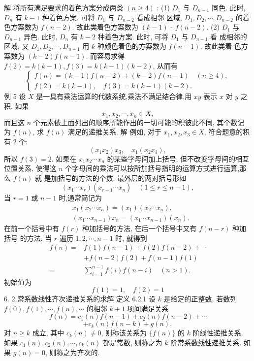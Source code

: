 \documentclass{report}
\begin{document}
	
	解 将所有满足要求的着色方案分成两类 $(n \geqslant 4)$ :
	(1) $D_1$ 与 $D_{n-1}$ 同色. 此时, $D_n$ 有 $k-1$ 种着色方案. 可将 $D_1$ 与 $D_{n-2}$ 看成相邻 区域, $D_1, D_2, \cdots, D_{n-2}$ 的着色方案数为 $f(n-2)$. 故此类着色方案数为 $(k-1)$ - $f(n-2)$.
	(2) $D_1$ 与 $D_{n-1}$ 异色. 此时, $D_n$ 有 $k-2$ 种着色方案. 此时, 可将 $D_1$ 与 $D_{n-1}$ 看 成相邻的区域. 又 $D_1, D_2, \cdots, D_{n-1}$ 用 $k$ 种颜色着色的方案数为 $f(n-1)$, 故此类着 色方案数为 $(k-2) f(n-1)$.
	而容易求得 $f(2)=k(k-1), f(3)=k(k-1)(k-2)$, 从而有
	$$
	\left\{\begin{array}{l}
	f(n)=(k-1) f(n-2)+(k-2) f(n-1) \quad(n \geqslant 4), \\
	f(2)=k(k-1), \quad f(3)=k(k-1)(k-2) .
	\end{array}\right.
	$$
	例 5 设 $X$ 是一具有乘法运算的代数系统,乘法不满足结合律,用 $x y$ 表示 $x$ 对 $y$ 之积. 如果
	$$
	x_1, x_2, \cdots, x_n \in X,
	$$
	而且这 $n$ 个元素依上面列出的顺序所能作出的一切可能的积彼此不同, 其个数记 为 $f(n)$, 求 $f(n)$ 满足的递推关系.
	解 例如, 对于 $x_1, x_2, x_3 \in X$, 符合题意的积有 2 个:
	$$
	\left(x_1 x_2\right) x_3, \quad x_1\left(x_2 x_3\right),
	$$
	所以 $f(3)=2$.
	如果在 $x_1 x_2 \cdots x_n$ 的某些字母间加上括号, 但不改变字母间的相互位置关系, 使得这 $n$ 个字母间的乘法可以按所加括号指明的运算方式进行运算,那么 $f(n)$ 就 是加括号的方法的个数.
	最外层的两对括号形如
	$$
	\left(x_1 \cdots x_r\right)\left(x_{r+1} \cdots x_n\right) \quad(1 \leqslant r \leqslant n-1),
	$$
	当 $r=1$ 或 $n-1$ 时,通常简记为
	$$
	\begin{aligned}
	&x_1\left(x_2 \cdots x_n\right)=\left(x_1\right)\left(x_2 \cdots x_n\right), \\
	&\left(x_1 \cdots x_{n-1}\right) x_n=\left(x_1 \cdots x_{n-1}\right)\left(x_n\right) .
	\end{aligned}
	$$
	在前一个括号中有 $f(r)$ 种加括号的方法, 在后一个括号中又有 $f(n-r)$ 种加括号 的方法, 当 $r$ 遍历 $1,2, \cdots, n-1$ 时, 就得到
	$$
	\begin{aligned}
	f(n)=& f(1) f(n-1)+f(2) f(n-2)+\cdots \\
	&+f(n-2) f(2)+f(n-1) f(1) \\
	=& \sum_{i=1}^{n-1} f(i) f(n-i) \quad(n>1) .
	\end{aligned}
	$$
	初始值为
	$$
	f(1)=1, \quad f(2)=1
	$$
	6. 2 常系数线性齐次递推关系的求解
	定义 6.2.1 设 $k$ 是给定的正整数, 若数列 $f(0), f(1), \cdots, f(n), \cdots$ 的相邻 $k+1$ 项间满足关系
	$$
	f(n)=c_1(n) f(n-1)+c_2(n) f(n-2)+\cdots
	$$
	$$
	+c_k(n) f(n-k)+g(n),
	$$
	对 $n \geqslant k$ 成立, 其中 $c_k(n) \neq 0$, 则称该关系为 $\{f(n)\}$ 的 $k$ 阶线性递推关系. 如果 $c_1(n), c_2(n), \cdots, c_k(n)$ 都是常数, 则称之为 $k$ 阶常系数线性递推关系. 如果 $g(n)=0$, 则称之为齐次的.
\end{document}
